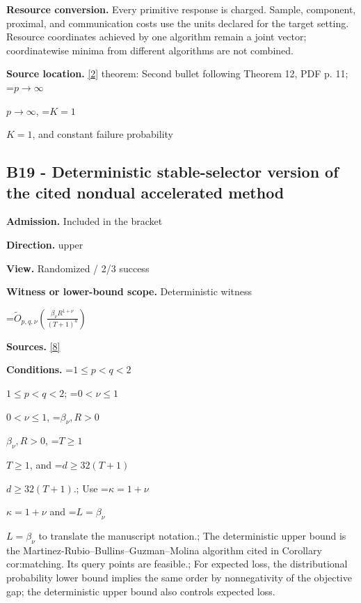 \documentclass[10pt,a4paper]{article}
\newcommand{\AtlasMath}[1]{\par\begingroup\centering\setbox0=\hbox{$\displaystyle #1$}\ifdim\wd0>1.4\linewidth\typeout{ATLAS WIDE FORMULA: \the\wd0}\fi\ifdim\wd0>\linewidth\resizebox{\linewidth}{!}{\box0}\else\box0\fi\par\endgroup}
\newcommand{\AtlasInlineMath}[1]{\begingroup\setbox0=\hbox{$#1$}\ifdim\wd0>.4\linewidth\endgroup\AtlasMath{#1}\else\endgroup$#1$\fi}
\begin{document}
\textbf{Resource conversion.} Every primitive response is charged. Sample, component, proximal, and communication costs use the units declared for the target setting. Resource coordinates achieved by one algorithm remain a joint vector; coordinatewise minima from different algorithms are not combined.



\textbf{Source location.} \href{https://proceedings.mlr.press/v99/diakonikolas19c/diakonikolas19c.pdf}{[2]} theorem: Second bullet following Theorem 12, PDF p. 11; \AtlasInlineMath{p\to\infty}, \AtlasInlineMath{K=1}, and constant failure probability



\subsection{B19 - Deterministic stable-selector version of the cited nondual accelerated method}


\textbf{Admission.} Included in the bracket



\textbf{Direction.} upper



\textbf{View.} Randomized / 2/3 success



\textbf{Witness or lower-bound scope.} Deterministic witness



\AtlasMath{\widetilde O_{p,q,\nu}\!\left(\frac{\beta_\nu R^{1+\nu}}{(T+1)^a}\right)}


\textbf{Sources.} \href{https://github.com/WU-Wendao/Colombo/blob/main/colombo_sensorium/Complexity_altas/data/sources/colombo/B1/manuscript.pdf}{[8]}



\textbf{Conditions.} \AtlasInlineMath{1\le p<q<2}; \AtlasInlineMath{0<\nu\le1}, \AtlasInlineMath{\beta_\nu,R>0}, \AtlasInlineMath{T\ge1}, and \AtlasInlineMath{d\ge32(T+1)}.; Use \AtlasInlineMath{\kappa=1+\nu} and \AtlasInlineMath{L=\beta_\nu} to translate the manuscript notation.; The deterministic upper bound is the Martinez-Rubio--Bullins--Guzman--Molina algorithm cited in Corollary cor:matching. Its query points are feasible.; For expected loss, the distributional probability lower bound implies the same order by nonnegativity of the objective gap; the deterministic upper bound also controls expected loss.
\end{document}
